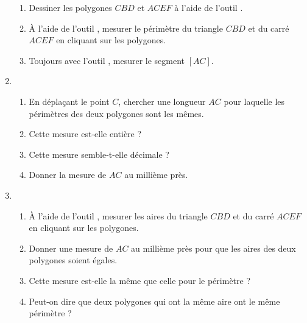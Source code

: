 \begin{enumerate}
\begin{enumerate}
        \item Dessiner les polygones $CBD$ et $ACEF$ à l'aide de l'outil \gpolygon{}.
        \item À l'aide de l'outil \glength{}, mesurer le périmètre du triangle $CBD$ et du carré $ACEF$ en cliquant sur les polygones.
        \item Toujours avec l'outil \glength{}, mesurer le segment $[AC]$.
    \end{enumerate}
    \item \begin{enumerate}
        \item En déplaçant le point $C$, chercher une longueur $AC$ pour laquelle les périmètres des deux polygones sont les mêmes.
        \item Cette mesure est-elle entière ?
        \item Cette mesure semble-t-elle décimale ? 
        \item Donner la mesure de $AC$ au millième près.
    \end{enumerate}
    \item \begin{enumerate}
        \item À l'aide de l'outil \garea{}, mesurer les aires du triangle $CBD$ et du carré $ACEF$ en cliquant sur les polygones.
        \item Donner une mesure de $AC$ au millième près pour que les aires des deux polygones soient égales.
        \item Cette mesure est-elle la même que celle pour le périmètre ?
        \item Peut-on dire que deux polygones qui ont la même aire ont le même périmètre ?
    \end{enumerate}
\end{enumerate}